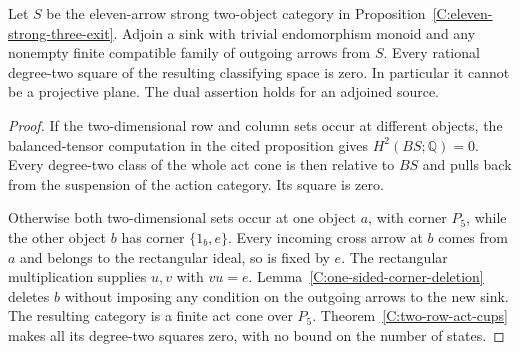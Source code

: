 \begin{corollary}
\label{C:eleven-strong-arbitrary-exit}
Let $S$ be the eleven-arrow strong two-object category in
Proposition~\ref{C:eleven-strong-three-exit}.  Adjoin a sink
with trivial endomorphism monoid and any nonempty finite
compatible family of outgoing arrows from $S$.
Every rational degree-two square of the resulting classifying
space is zero.  In particular it cannot be a projective plane.
The dual assertion holds for an adjoined source.
\end{corollary}
\begin{proof}
If the two-dimensional row and column sets occur at different
objects, the balanced-tensor computation in the cited proposition
gives $H^2(BS;\mathbb Q)=0$.  Every degree-two class of the
whole act cone is then relative to $BS$ and pulls back from
the suspension of the action category.  Its square is zero.

Otherwise both two-dimensional sets occur at one object $a$,
with corner $P_5$, while the other object $b$ has corner
$\{1_b,e\}$.  Every incoming cross arrow at $b$ comes from
$a$ and belongs to the rectangular ideal, so is fixed by $e$.
The rectangular multiplication supplies $u,v$ with $vu=e$.
Lemma~\ref{C:one-sided-corner-deletion} deletes $b$ without
imposing any condition on the outgoing arrows to the new sink.
The resulting category is a finite act cone over $P_5$.
Theorem~\ref{C:two-row-act-cups} makes all its degree-two
squares zero, with no bound on the number of states.
\end{proof}
